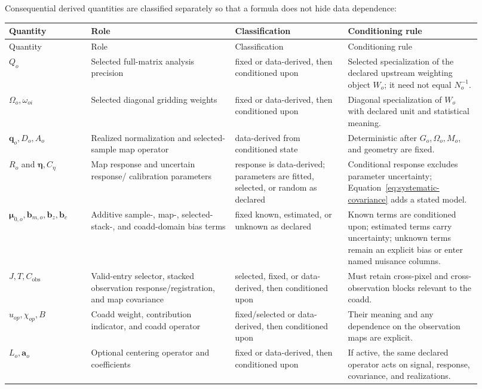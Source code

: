 \documentclass[11pt]{article}
\begin{document}
Consequential derived quantities are classified separately so that a formula
does not hide data dependence:

\begin{longtable}{L{0.16\linewidth}L{0.28\linewidth}L{0.22\linewidth}L{0.26\linewidth}}
\toprule
Quantity & Role & Classification & Conditioning rule\\
\midrule
\endfirsthead
\toprule
Quantity & Role & Classification & Conditioning rule\\
\midrule
\endhead
\(Q_o\) & Selected full-matrix analysis precision & fixed or data-derived,
then conditioned upon & Selected specialization of the declared upstream
weighting object \(W_o\); it need not equal \(N_o^{-1}\).\\
\(\Omega_o,\omega_{oi}\) & Selected diagonal gridding weights & fixed or
data-derived, then conditioned upon & Diagonal specialization of \(W_o\) with
declared unit and statistical meaning.\\
\(\boldsymbol q_o,D_o,A_o\) & Realized normalization and selected-sample map
operator & data-derived from conditioned state & Deterministic after
\(G_o,\Omega_o,M_o\), and geometry are fixed.\\
\(R_o\) and \(\boldsymbol\eta,C_\eta\) & Map response and uncertain response/
calibration parameters & response is data-derived; parameters are fitted,
selected, or random as declared & Conditional response excludes parameter
uncertainty; Equation~\eqref{eq:systematic-covariance} adds a stated model.\\
\(\boldsymbol\mu_{0,o},\boldsymbol b_{m,o},\boldsymbol b_z,
\boldsymbol b_c\) & Additive sample-, map-, selected-stack-, and coadd-domain
bias terms & fixed known, estimated, or unknown as declared & Known terms are
conditioned upon; estimated terms carry uncertainty; unknown terms remain an
explicit bias or enter named nuisance columns.\\
\(J,T,C_{\mathrm{obs}}\) & Valid-entry selector, stacked observation
response/registration, and map covariance & selected, fixed, or data-derived,
then conditioned upon & Must retain
cross-pixel and cross-observation blocks relevant to the coadd.\\
\(u_{op},\chi_{op},B\) & Coadd weight, contribution indicator, and coadd
operator & fixed/selected or data-derived, then conditioned upon & Their
meaning and any dependence on the observation maps are explicit.\\
\(L_o,\boldsymbol a_o\) & Optional centering operator and coefficients & fixed
or data-derived, then conditioned upon & If active, the same declared operator
acts on signal, response, covariance, and realizations.\\
\bottomrule
\end{longtable}
\end{document}
